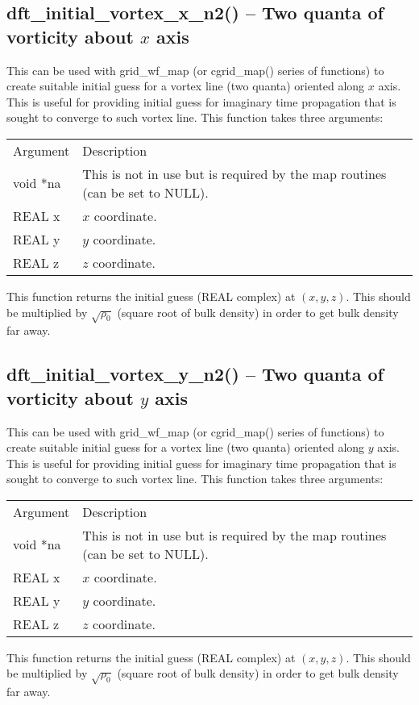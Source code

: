 \documentclass[12pt,letterpaper]{report}
\begin{document}
\subsection{dft\_initial\_vortex\_x\_n2() -- Two quanta of vorticity about $x$ axis}

This can be used with grid\_wf\_map (or cgrid\_map() series of functions) to create suitable initial guess for a vortex line (two quanta) oriented along $x$ axis. This is useful for providing initial guess for imaginary time propagation that is sought to converge to such vortex line. This function takes three arguments:
\begin{longtable}{p{} p{}}
Argument & Description\\
\cline{1-2}
void *na & This is not in use but is required by the map routines (can be set to NULL).\\
REAL x & $x$ coordinate.\\
REAL y & $y$ coordinate.\\
REAL z & $z$ coordinate.\\
\end{longtable}
\noindent
This function returns the initial guess (REAL complex) at $(x, y, z)$. This should be multiplied by $\sqrt{\rho_0}$ (square root of bulk density) in order to get bulk density far away. 

\subsection{dft\_initial\_vortex\_y\_n2() -- Two quanta of vorticity about $y$ axis}

This can be used with grid\_wf\_map (or cgrid\_map() series of functions) to create suitable initial guess for a vortex line (two quanta) oriented along $y$ axis. This is useful for providing initial guess for imaginary time propagation that is sought to converge to such vortex line. This function takes three arguments:
\begin{longtable}{p{} p{}}
Argument & Description\\
\cline{1-2}
void *na & This is not in use but is required by the map routines (can be set to NULL).\\
REAL x & $x$ coordinate.\\
REAL y & $y$ coordinate.\\
REAL z & $z$ coordinate.\\
\end{longtable}
\noindent
This function returns the initial guess (REAL complex) at $(x, y, z)$. This should be multiplied by $\sqrt{\rho_0}$ (square root of bulk density) in order to get bulk density far away. 
\end{document}
